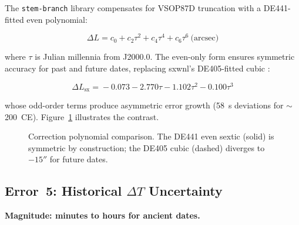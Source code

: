 \documentclass[10pt,a4paper]{article}
\begin{document}
The \texttt{stem-branch} library compensates for VSOP87D truncation with a
DE441-fitted even polynomial:

\begin{equation}
  \Delta L = c_0 + c_2\tau^2 + c_4\tau^4 + c_6\tau^6 ~ \text{(arcsec)}
  \label{eq:correction}
\end{equation}

\noindent where $\tau$ is Julian millennia from J2000.0. The even-only form
ensures symmetric accuracy for past and future dates, replacing sxwnl's
DE405-fitted cubic \cite{sxwnl_github}:

\begin{equation}
  \Delta L_{\text{sx}} \!=\! {-}0.073 {-} 2.770\tau {-} 1.102\tau^2 {-} 0.100\tau^3
  \label{eq:sxwnl_correction}
\end{equation}

\noindent whose odd-order terms produce asymmetric error growth (58~s
deviations for $\sim$200~CE). Figure~\ref{fig:correction} illustrates the
contrast.

\begin{figure}[H]
\centering
{}
\caption{Correction polynomial comparison. The DE441 even sextic (solid) is
symmetric by construction; the DE405 cubic (dashed) diverges to $-15''$ for
future dates.}
\label{fig:correction}
\end{figure}

\subsection{Error~5: Historical $\Delta T$ Uncertainty}

\textbf{Magnitude: minutes to hours for ancient dates.}
\end{document}
